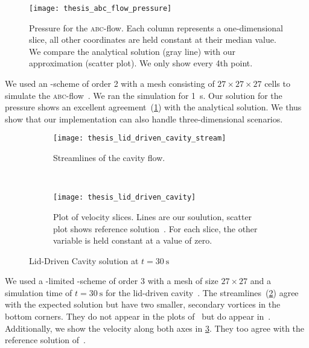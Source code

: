 \begin{figure}[htb]
  \centering
  \texttt{[image: thesis\_abc\_flow\_pressure]}
  \caption{\label{fig:abc-result}%
  Pressure for the \textsc{abc}-flow.
  Each column represents a one-dimensional slice, all other coordinates are held constant at their median value.
  We compare the analytical solution (gray line) with our approximation (scatter plot).
  We only show every 4th point.}
\end{figure}
We used an \aderdg{}-scheme of order 2 with a mesh consisting of $27 \times 27 \times 27$ cells to simulate the \textsc{abc}-flow~.
We ran the simulation for \SI{1}{\s}.
Our solution for the pressure shows an excellent agreement~(\cref{fig:abc-result}) with the analytical solution.
We thus show that our implementation can also handle three-dimensional scenarios.

\begin{figure}[htb]
  \centering
  \begin{subfigure}[t]{0.5\textwidth}
    \centering
    \texttt{[image: thesis\_lid\_driven\_cavity\_stream]}
    \caption{\label{fig:lid-driven-cavity-streamlines}%
      Streamlines of the cavity flow.}
  \end{subfigure}~%
  \begin{subfigure}[t]{0.5\textwidth}
    \centering
    \texttt{[image: thesis\_lid\_driven\_cavity]}
    \caption{\label{fig:lid-driven-cavity-result}%
      Plot of velocity slices. Lines are our soulution, scatter plot shows reference solution~\cite{ghia1982high}.
      For each slice, the other variable is held constant at a value of zero.}
  \end{subfigure}
  
  \caption{\label{fig:lid-driven-cavity}%
    Lid-Driven Cavity solution at $t=\SI{30}{\s}$}
  
\end{figure}
We used a \muscl{}-limited \aderdg{}-scheme of order 3 with a mesh of size $27 \times 27$ and a simulation time of $t = \SI{30}{\s}$ for the lid-driven cavity~.
The streamlines~(\cref{fig:lid-driven-cavity-streamlines}) agree with the expected solution but have two smaller, secondary vortices in the bottom corners.
They do not appear in the plots of~\cite{dumbser2010arbitrary} but do appear in~\cite{ghia1982high}.
Additionally, we show the velocity along both axes in \cref{fig:lid-driven-cavity-result}.
They too agree with the reference solution of~\cite{ghia1982high}.

